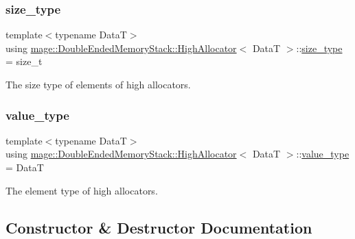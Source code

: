 \subsubsection{\texorpdfstring{size\+\_\+type}{size\_type}}
{\footnotesize\ttfamily template$<$typename DataT$>$ \\
using \hyperlink{structmage_1_1_double_ended_memory_stack_1_1_high_allocator}{mage\+::\+Double\+Ended\+Memory\+Stack\+::\+High\+Allocator}$<$ DataT $>$\+::\hyperlink{structmage_1_1_double_ended_memory_stack_1_1_high_allocator_a0d2e29171c7898850631b1a57a29fe0d}{size\+\_\+type} =  size\+\_\+t}

The size type of elements of high allocators. \hypertarget{structmage_1_1_double_ended_memory_stack_1_1_high_allocator_a43b87cea37b3bbba57ca794e9785e82d}{}\label{structmage_1_1_double_ended_memory_stack_1_1_high_allocator_a43b87cea37b3bbba57ca794e9785e82d} 
\subsubsection{\texorpdfstring{value\+\_\+type}{value\_type}}
{\footnotesize\ttfamily template$<$typename DataT$>$ \\
using \hyperlink{structmage_1_1_double_ended_memory_stack_1_1_high_allocator}{mage\+::\+Double\+Ended\+Memory\+Stack\+::\+High\+Allocator}$<$ DataT $>$\+::\hyperlink{structmage_1_1_double_ended_memory_stack_1_1_high_allocator_a43b87cea37b3bbba57ca794e9785e82d}{value\+\_\+type} =  DataT}

The element type of high allocators. 

\subsection{Constructor \& Destructor Documentation}
\hypertarget{structmage_1_1_double_ended_memory_stack_1_1_high_allocator_a2add3798ed5b619bc1e44885de0325cd}{}\label{structmage_1_1_double_ended_memory_stack_1_1_high_allocator_a2add3798ed5b619bc1e44885de0325cd} 

